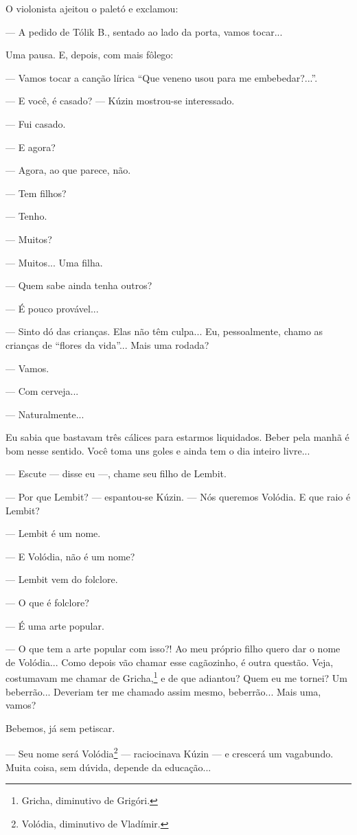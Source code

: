 O violonista ajeitou o paletó e exclamou:

--- A pedido de Tólik B., sentado ao lado da porta, vamos tocar...

Uma pausa. E, depois, com mais fôlego:

--- Vamos tocar a canção lírica ``Que veneno usou para me
embebedar?...''.

--- E você, é casado? --- Kúzin mostrou-se interessado.

--- Fui casado.

--- E agora?

--- Agora, ao que parece, não.

--- Tem filhos?

--- Tenho.

--- Muitos?

--- Muitos... Uma filha.

--- Quem sabe ainda tenha outros?

--- É pouco provável...

--- Sinto dó das crianças. Elas não têm culpa... Eu, pessoalmente, chamo
as crianças de ``flores da vida''... Mais uma rodada?

--- Vamos.

--- Com cerveja...

--- Naturalmente...

Eu sabia que bastavam três cálices para estarmos liquidados. Beber pela
manhã é bom nesse sentido. Você toma uns goles e ainda tem o dia inteiro
livre...

--- Escute --- disse eu ---, chame seu filho de Lembit.

--- Por que Lembit? --- espantou-se Kúzin. --- Nós queremos Volódia. E
que raio é Lembit?

--- Lembit é um nome.

--- E Volódia, não é um nome?

--- Lembit vem do folclore.

--- O que é folclore?

--- É uma arte popular.

--- O que tem a arte popular com isso?! Ao meu próprio filho quero dar o
nome de Volódia... Como depois vão chamar esse cagãozinho, é outra
questão. Veja, costumavam me chamar de Gricha,\footnote{Gricha,
  diminutivo de Grigóri.} e de que adiantou? Quem eu me tornei? Um
beberrão... Deveriam ter me chamado assim mesmo, beberrão... Mais uma,
vamos?

Bebemos, já sem petiscar.

--- Seu nome será Volódia\footnote{Volódia, diminutivo de Vladímir.} ---
raciocinava Kúzin --- e crescerá um vagabundo. Muita coisa, sem dúvida,
depende da educação...


